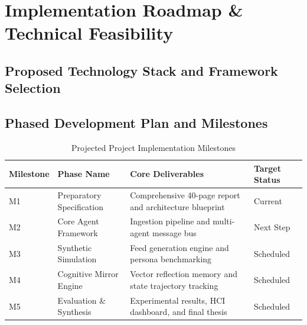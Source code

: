 \chapter{Implementation Roadmap \& Technical Feasibility}
\label{chap:implementation_roadmap}

\section{Proposed Technology Stack and Framework Selection}
\label{sec:impl_tech_stack}

\section{Phased Development Plan and Milestones}
\label{sec:impl_milestones}

\begin{table}[H]
    \centering
    \caption{Projected Project Implementation Milestones}
    \label{tab:milestones}
    \begin{tabularx}{\textwidth}{p{2.0cm}p{3.2cm}Xl}
        \toprule
        \textbf{Milestone} & \textbf{Phase Name} & \textbf{Core Deliverables} & \textbf{Target Status} \\
        \midrule
        M1 & Preparatory Specification & Comprehensive 40-page report and architecture blueprint & Current \\
        M2 & Core Agent Framework & Ingestion pipeline and multi-agent message bus & Next Step \\
        M3 & Synthetic Simulation & Feed generation engine and persona benchmarking & Scheduled \\
        M4 & Cognitive Mirror Engine & Vector reflection memory and state trajectory tracking & Scheduled \\
        M5 & Evaluation \& Synthesis & Experimental results, HCI dashboard, and final thesis & Scheduled \\
        \bottomrule
    \end{tabularx}
\end{table}

